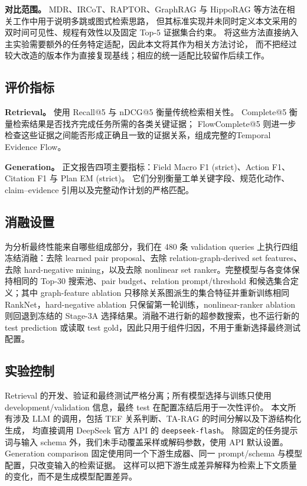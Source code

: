 \textbf{对比范围。}
MDR、IRCoT、RAPTOR、GraphRAG 与 HippoRAG 等方法在相关工作中用于说明多跳或图式检索思路，
但其标准实现并未同时定义本文采用的双时间可见性、规程有效性以及固定 Top-5 证据集合约束。
将这些方法直接纳入主实验需要额外的任务特定适配，因此本文将其作为相关方法讨论，
而不把经过较大改造的版本作为直接复现基线；相应的统一适配比较留作后续工作。

\subsection{评价指标}
\label{sec:metrics}

\textbf{Retrieval。}
使用 Recall@5 与 nDCG@5 衡量传统检索相关性。
Complete@5 衡量检索结果是否找齐完成任务所需的各类关键证据；
FlowComplete@5 则进一步检查这些证据之间能否形成正确且一致的证据关系，组成完整的Temporal Evidence Flow。

\textbf{Generation。}
正文报告四项主要指标：Field Macro F1 (strict)、Action F1、Citation F1 与 Plan EM (strict)。
它们分别衡量工单关键字段、规范化动作、claim--evidence 引用以及完整动作计划的严格匹配。

\subsection{消融设置}

为分析最终性能来自哪些组成部分，我们在 480 条 validation queries 上执行四组冻结消融：去除 learned pair proposal、去除 relation-graph-derived set features、去除 hard-negative mining，以及去除 nonlinear set ranker。完整模型与各变体保持相同的 Top-30 搜索池、pair budget、relation prompt/threshold 和候选集合定义；其中 graph-feature ablation 只移除关系图派生的集合特征并重新训练相同 RankNet，hard-negative ablation 只保留第一轮训练，nonlinear-ranker ablation 则回退到冻结的 Stage-3A 选择结果。消融不进行新的超参数搜索，也不运行新的 test prediction 或读取 test gold，因此只用于组件归因，不用于重新选择最终测试配置。

\subsection{实验控制}

Retrieval 的开发、验证和最终测试严格分离；所有模型选择与训练只使用 development/validation 信息，最终 test 在配置冻结后用于一次性评价。
本文所有涉及 LLM 的调用，包括 TEF 关系判断、TA-RAG 的时间分解以及下游结构化生成，
均直接调用 DeepSeek 官方 API 的 \texttt{deepseek-flash}。
除固定的任务提示词与输入 schema 外，我们未手动覆盖采样或解码参数，使用 API 默认设置。
Generation comparison 固定使用同一个下游生成器、同一 prompt/schema 与模型配置，只改变输入的检索证据。
这样可以把下游生成差异解释为检索上下文质量的变化，而不是生成模型配置差异。

